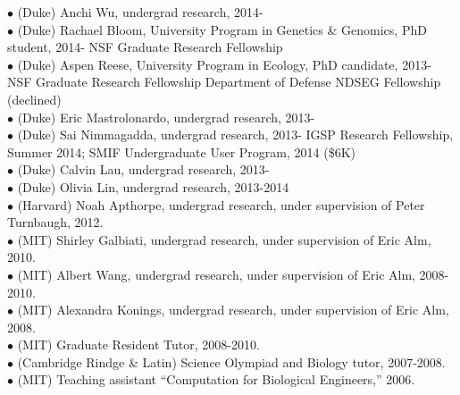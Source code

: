\documentclass[overlapped,line,11pt]{res}
\begin{document}
\begin{resume}
\hangindent=0.5in 

$\bullet$\hspace{.1in} (Duke) Anchi Wu, undergrad research,
2014- \\
$\bullet$\hspace{.1in} (Duke) Rachael Bloom, University Program in
Genetics \& Genomics, PhD student, 2014- 
\newline\hspace*{2em} NSF Graduate Research Fellowship \\
$\bullet$\hspace{.1in} (Duke) Aspen Reese, University Program in
Ecology, PhD candidate, 2013- 
\newline\hspace*{2em} NSF Graduate Research Fellowship
\newline\hspace*{2em} Department of Defense NDSEG Fellowship (declined)
\\
$\bullet$\hspace{.1in} (Duke) Eric Mastrolonardo, undergrad research, 2013- \\
$\bullet$\hspace{.1in} (Duke) Sai Nimmagadda, undergrad research,
2013- \newline\hspace*{2em} IGSP Research
Fellowship, Summer 2014; \newline\hspace*{2em} SMIF Undergraduate User Program, 2014
(\$6K) \\
$\bullet$\hspace{.1in} (Duke) Calvin Lau, undergrad research, 2013- \\
$\bullet$\hspace{.1in} (Duke) Olivia Lin, undergrad research, 2013-2014 \\
$\bullet$\hspace{.1in} (Harvard) Noah Apthorpe, undergrad research, under
supervision of Peter Turnbaugh, 2012. \\
$\bullet$\hspace{.1in} (MIT) Shirley Galbiati, undergrad research, under
supervision of Eric Alm, 2010. \\
$\bullet$\hspace{.1in} (MIT) Albert Wang, undergrad research, under
supervision of Eric Alm, 2008-2010. \\
$\bullet$\hspace{.1in} (MIT) Alexandra Konings, undergrad research, under
supervision of Eric Alm, 2008. \\
$\bullet$\hspace{.1in} (MIT) Graduate Resident Tutor, 2008-2010. \\
$\bullet$\hspace{.1in} (Cambridge Rindge \& Latin) Science Olympiad and Biology tutor, 2007-2008. \\
$\bullet$\hspace{.1in} (MIT) Teaching assistant ``Computation for Biological Engineers,'' 2006. 


\end{resume}
\end{document}
